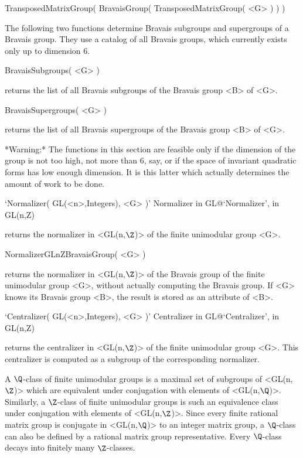 \)TransposedMatrixGroup( BravaisGroup( TransposedMatrixGroup( <G> ) ) ) 

The following two functions determine Bravais subgroups and
supergroups of a Bravais group. They use a catalog of all 
Bravais groups, which currently exists only up to dimension 6.

\> BravaisSubgroups( <G> )

returns the list of all Bravais subgroups of the Bravais group 
<B> of <G>.

\> BravaisSupergroups( <G> )

returns the list of all Bravais supergroups of the Bravais group 
<B> of <G>.



*Warning:* The functions in this section are feasible only if the 
dimension of the group is not too high, not more than 6, say, 
or if the space of invariant quadratic forms has low enough
dimension. It is this latter which actually determines the amount
of work to be done.
\def\cp{)}

\> `Normalizer( GL(<n>,Integers), <G> )'%
{Normalizer in GL}@{`Normalizer', in GL(n,Z)}

returns the normalizer in <GL(n,$\Z$)> of the finite unimodular group
<G>.

\> NormalizerGLnZBravaisGroup( <G> )

returns the normalizer in <GL(n,$\Z$)> of the Bravais group of the
finite unimodular group <G>, without actually computing the
Bravais group. If <G> knows its Bravais group <B>, the result is 
stored as an attribute of <B>.

\> `Centralizer( GL(<n>,Integers), <G> )'%
{Centralizer in GL}@{`Centralizer', in GL(n,Z)}

returns the centralizer in <GL(n,$\Z$)> of the finite unimodular group
<G>. This centralizer is computed as a subgroup of the corresponding
normalizer.



A $\Q$-class of finite unimodular groups is a maximal set of subgroups
of <GL(n,$\Z$)> which are equivalent under conjugation with elements of
<GL(n,$\Q$)>. Similarly, a $\Z$-class of finite unimodular groups is such 
an equivalence class under conjugation with elements of <GL(n,$\Z$)>.
Since every finite rational matrix group is conjugate in <GL(n,$\Q$)> 
to an integer matrix group, a $\Q$-class can also be defined by a rational
matrix group representative. Every $\Q$-class decays into finitely many
$\Z$-classes. 

